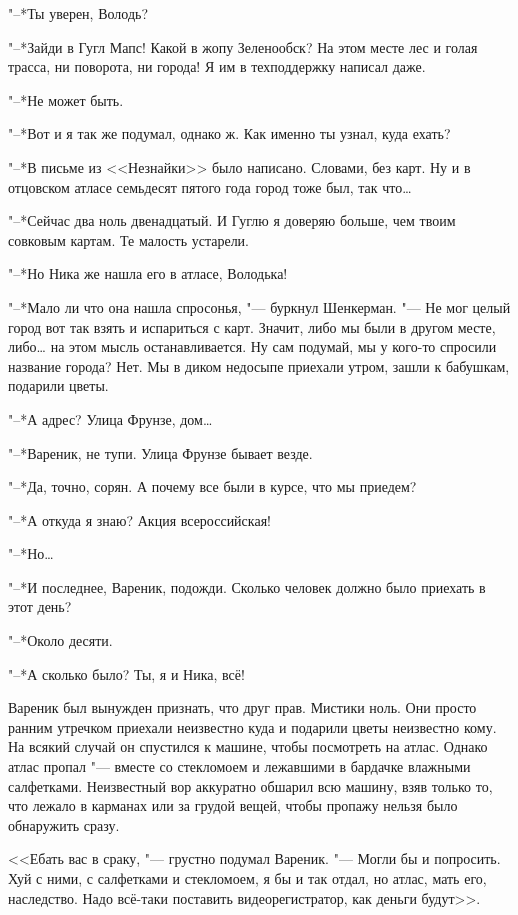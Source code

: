 "--*Ты уверен, Володь?

"--*Зайди в Гугл Мапс!
Какой в жопу Зеленообск?
На этом месте лес и голая трасса, ни поворота, ни города!
Я им в техподдержку написал даже.

"--*Не может быть.

"--*Вот и я так же подумал, однако ж.
Как именно ты узнал, куда ехать?

"--*В письме из <<Незнайки>> было написано.
Словами, без карт.
Ну и в отцовском атласе семьдесят пятого года город тоже был, так что\ldots{}

"--*Сейчас два ноль двенадцатый.
И Гуглю я доверяю больше, чем твоим совковым картам.
Те малость устарели.

"--*Но Ника же нашла его в атласе, Володька!

"--*Мало ли что она нашла спросонья, "--- буркнул Шенкерман.
"--- Не мог целый город вот так взять и испариться с карт.
Значит, либо мы были в другом месте, либо\ldots{} на этом мысль останавливается.
Ну сам подумай, мы у кого-то спросили название города?
Нет.
Мы в диком недосыпе приехали утром, зашли к бабушкам, подарили цветы.

"--*А адрес?
Улица Фрунзе, дом\ldots{}

"--*Вареник, не тупи.
Улица Фрунзе бывает везде.

"--*Да, точно, сорян.
А почему все были в курсе, что мы приедем?

"--*А откуда я знаю?
Акция всероссийская!

"--*Но\ldots{}

"--*И последнее, Вареник, подожди.
Сколько человек должно было приехать в этот день?

"--*Около десяти.

"--*А сколько было?
Ты, я и Ника, всё!

Вареник был вынужден признать, что друг прав.
Мистики ноль.
Они просто ранним утречком приехали неизвестно куда и подарили цветы неизвестно кому.
На всякий случай он спустился к машине, чтобы посмотреть на атлас.
Однако атлас пропал "--- вместе со стекломоем и лежавшими в бардачке влажными салфетками.
Неизвестный вор аккуратно обшарил всю машину, взяв только то, что лежало в карманах или за грудой вещей, чтобы пропажу нельзя было обнаружить сразу.

<<Ебать вас в сраку, "--- грустно подумал Вареник.
"--- Могли бы и попросить.
Хуй с ними, с салфетками и стекломоем, я бы и так отдал, но атлас, мать его, наследство.
Надо всё-таки поставить видеорегистратор, как деньги будут>>.

